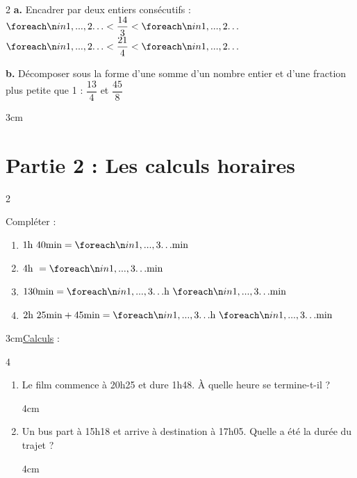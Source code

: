 \documentclass[a4paper]{book}
\begin{document}
{    \newpage
    
    \begin{exerciceNote}{2}    
        \textbf{a.} Encadrer par deux entiers consécutifs :
        $\points[2] < \dfrac{14}{3} < \points[2]$ \hspace{1cm} $\points[2] < \dfrac{21}{4} < \points[2]$
        
        \textbf{b.} Décomposer sous la forme d'une somme d'un nombre entier et d'une fraction plus petite que 1 :  
        $\dfrac{13}{4}$ et $\dfrac{45}{8}$
        \begin{ZoneReponse}{3cm} \end{ZoneReponse}
    \end{exerciceNote}
    
    \section*{Partie 2 : Les calculs horaires}
        
    \begin{exerciceNote}{2}
        \begin{minipage}{0.40\linewidth}
            Compléter :
            \begin{enumerate}
                \item $1\text{h } 40\text{min} = \points[3] \text{min}$
                \item $4\text{h } = \points[3] \text{min}$
                \item $130\text{min} = \points[3]\text{h } \points[3]\text{min}$
                \item $2\text{h } 25\text{min} + 45\text{min} = \points[3]\text{h } \points[3]\text{min}$
            \end{enumerate}
        \end{minipage}
        \hfill
        \begin{minipage}{0.55\linewidth}
            \begin{ZoneReponse}{3cm}\underline{Calculs} : \end{ZoneReponse}
        \end{minipage}  
    \end{exerciceNote}
        
    \begin{exerciceNote}{4}
        \begin{enumerate}[leftmargin=*]
            \item Le film commence à 20h25 et dure 1h48. À quelle heure se termine-t-il ?
            \begin{ZoneReponse}{4cm} \end{ZoneReponse}
            \item Un bus part à 15h18 et arrive à destination à 17h05. Quelle a été la durée du trajet ?
            \begin{ZoneReponse}{4cm} \end{ZoneReponse}
        \end{enumerate}
    \end{exerciceNote}
        
}
\end{document}
